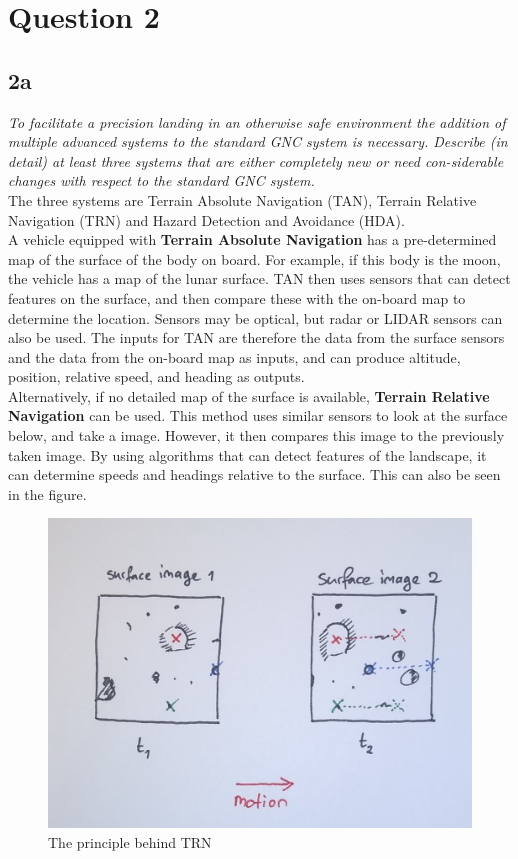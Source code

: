 \section{Question 2}\label{sec:q2}    
\subsection{2a}
\textit{To facilitate a precision landing in an otherwise safe environment
the addition of multiple advanced systems to the standard GNC system is necessary. Describe (in detail) at least three systems that are either completely new or need con-siderable changes with respect to the standard GNC system.}\\

The three systems are Terrain Absolute Navigation (TAN), Terrain Relative Navigation (TRN) and Hazard Detection and Avoidance (HDA).\\

A vehicle equipped with \textbf{Terrain Absolute Navigation} has a pre-determined map of the surface of the body on board. For example, if this body is the moon, the vehicle has a map of the lunar surface. TAN then uses sensors that can detect features on the surface, and then compare these with the on-board map to determine the location. Sensors may be optical, but radar or LIDAR sensors can also be used. The inputs for TAN are therefore the data from the surface sensors and the data from the on-board map as inputs, and can produce altitude, position, relative speed, and heading as outputs.\\

Alternatively, if no detailed map of the surface is available, \textbf{Terrain Relative Navigation} can be used. This method uses similar sensors to look at the surface below, and take a image. However, it then compares this image to the previously taken image. By using algorithms that can detect features of the landscape, it can determine speeds and headings relative to the surface. This can also be seen in the figure.
\begin{figure}[H]
    \centering
    \includegraphics[width=0.5\columnwidth]{Figures/picture_TRN.jpg}
    \caption{The principle behind TRN}
    \label{fig:TRN}
\end{figure}


